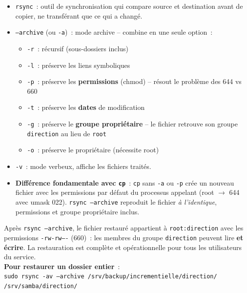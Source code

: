 \documentclass[12pt,a4paper]{article}
\begin{document}
\begin{explainbox}
\begin{itemize}[leftmargin=1.5em,topsep=2pt]
  \item \texttt{rsync}~: outil de synchronisation qui compare source et destination
    avant de copier, ne transférant que ce qui a changé.
  \item \texttt{--archive} (ou \texttt{-a})~: mode archive -- combine en une seule
    option~:
    \begin{itemize}[leftmargin=1.5em]
      \item \texttt{-r}~: récursif (sous-dossiers inclus)
      \item \texttt{-l}~: préserve les liens symboliques
      \item \texttt{-p}~: préserve les \textbf{permissions} (chmod) -- résout le
        problème des 644 vs 660
      \item \texttt{-t}~: préserve les \textbf{dates} de modification
      \item \texttt{-g}~: préserve le \textbf{groupe propriétaire} -- le fichier
        retrouve son groupe \texttt{direction} au lieu de \texttt{root}
      \item \texttt{-o}~: préserve le propriétaire (nécessite root)
    \end{itemize}
  \item \texttt{-v}~: mode verbeux, affiche les fichiers traités.
  \item \textbf{Différence fondamentale avec \texttt{cp}}~: \texttt{cp} sans
    \texttt{-a} ou \texttt{-p} crée un nouveau fichier avec les permissions par
    défaut du processus appelant (root $\rightarrow$ 644 avec umask 022).
    \texttt{rsync --archive} reproduit le fichier \textit{à l'identique}, permissions
    et groupe propriétaire inclus.
\end{itemize}
\end{explainbox}

\begin{successbox}
Après \texttt{rsync --archive}, le fichier restauré appartient à \texttt{root:direction}
avec les permissions \texttt{-rw-rw----} (660)~: les membres du groupe
\texttt{direction} peuvent lire \textbf{et écrire}. La restauration est complète et
opérationnelle pour tous les utilisateurs du service.\\[6pt]
\textbf{Pour restaurer un dossier entier}~:\\
\texttt{sudo rsync -av --archive /srv/backup/incrementielle/direction/}
\texttt{/srv/samba/direction/}
\end{successbox}
\end{document}
